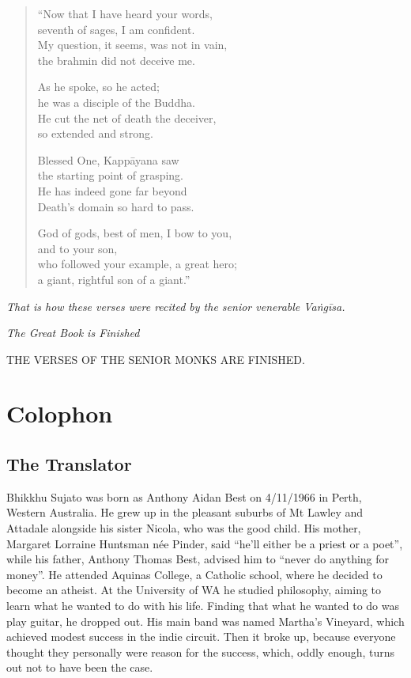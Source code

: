 \documentclass[12pt,openany]{book}%
\newcommand*{\scendsection}[1]{\begin{center}\textit{#1}\end{center}}
\newcommand*{\scendsutta}[1]{\begin{center}\textit{#1}\end{center}}
\newcommand*{\scendbook}[1]{\begin{center}\uppercase{#1}\end{center}}
\let\oldbackmatter\backmatter
\renewcommand{\backmatter}{%
\chapterfont{\setstretch{.85}\normalfont\centering}%
\sectionfont{\setstretch{.85}\Semiboldsubheadfont}%
\oldbackmatter}
\begin{document}
\begin{verse}
“Now that I have heard your words, \\
seventh of sages, I am confident. \\
My question, it seems, was not in vain, \\
the brahmin did not deceive me. 

As he spoke, so he acted; \\
he was a disciple of the Buddha. \\
He cut the net of death the deceiver, \\
so extended and strong. 

Blessed One, \textsanskrit{Kappāyana} saw \\
the starting point of grasping. \\
He has indeed gone far beyond \\
Death’s domain so hard to pass. 

God of gods, best of men, I bow to you, \\
and to your son, \\
who followed your example, a great hero; \\
a giant, rightful son of a giant.” 

%
\end{verse}

\scendsutta{That is how these verses were recited by the senior venerable \textsanskrit{Vaṅgīsa}. }

\scendsection{The Great Book is Finished }

\scendbook{The Verses of the Senior Monks are finished. }

%
\backmatter%
\chapter*{Colophon}

\section*{The Translator}

Bhikkhu Sujato was born as Anthony Aidan Best on 4/11/1966 in Perth, Western Australia. He grew up in the pleasant suburbs of Mt Lawley and Attadale alongside his sister Nicola, who was the good child. His mother, Margaret Lorraine Huntsman née Pinder, said “he’ll either be a priest or a poet”, while his father, Anthony Thomas Best, advised him to “never do anything for money”. He attended Aquinas College, a Catholic school, where he decided to become an atheist. At the University of WA he studied philosophy, aiming to learn what he wanted to do with his life. Finding that what he wanted to do was play guitar, he dropped out. His main band was named Martha’s Vineyard, which achieved modest success in the indie circuit. Then it broke up, because everyone thought they personally were reason for the success, which, oddly enough, turns out not to have been the case. 
\end{document}
